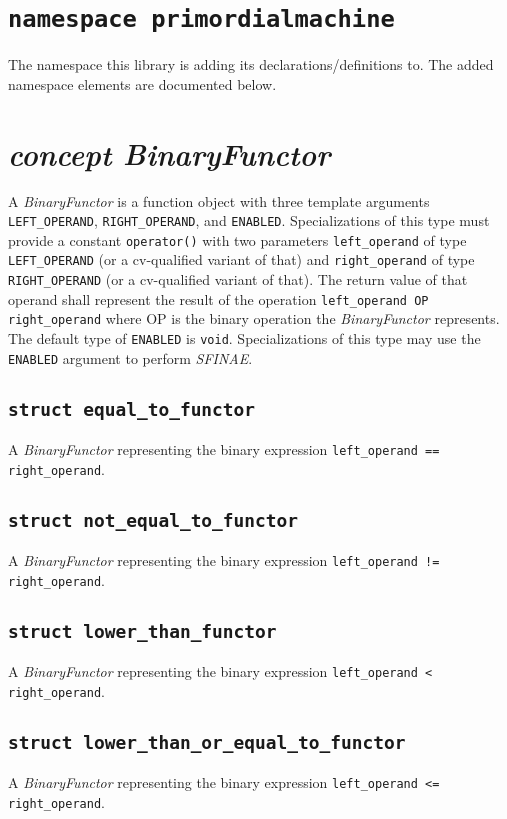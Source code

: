 \documentclass[oneside]{book}
\begin{document}
\section{\texttt{namespace primordialmachine}}
The namespace this library is adding its declarations/definitions to.
The added namespace elements are documented below.

\section{\textit{concept BinaryFunctor}}
A \textit{BinaryFunctor} is a function object with three template arguments \verb+LEFT_OPERAND+,
\verb+RIGHT_OPERAND+, and \verb+ENABLED+. Specializations of this type must provide a
constant \verb+operator()+ with two parameters \verb+left_operand+ of type \verb+LEFT_OPERAND+
(or a cv-qualified variant of that) and \verb+right_operand+ of type \verb+RIGHT_OPERAND+
(or a cv-qualified variant of that). The return value of that operand shall represent the
result of the operation \verb+left_operand OP right_operand+ where OP is the binary operation
the \textit{BinaryFunctor} represents.\\

\noindent{}The default type of \verb+ENABLED+ is \verb+void+. Specializations of this type may use
the \verb+ENABLED+ argument to perform \textit{SFINAE}.

\subsection{\texttt{struct equal\_to\_functor}}
A \textit{BinaryFunctor} representing the binary expression \verb|left_operand == right_operand|.

\subsection{\texttt{struct not\_equal\_to\_functor}}
A \textit{BinaryFunctor} representing the binary expression \verb|left_operand != right_operand|.

\subsection{\texttt{struct lower\_than\_functor}}
A \textit{BinaryFunctor} representing the binary expression \verb|left_operand < right_operand|.

\subsection{\texttt{struct lower\_than\_or\_equal\_to\_functor}}
A \textit{BinaryFunctor} representing the binary expression \verb|left_operand <= right_operand|.
\end{document}
